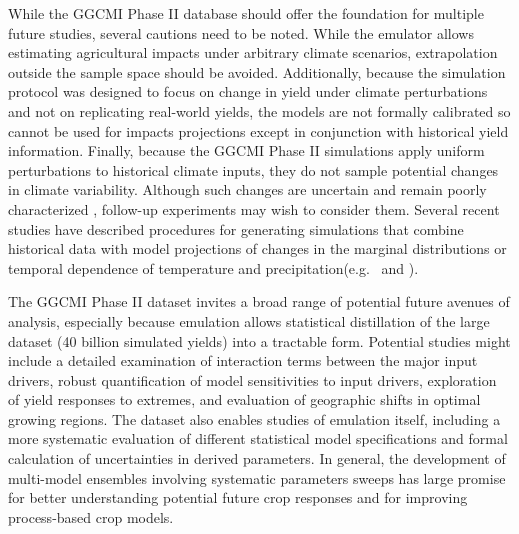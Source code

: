 \documentclass[gmd, manuscript]{copernicus} %
\begin{document}
While the GGCMI Phase II database should offer the foundation for multiple future studies, several cautions need to be noted. While the emulator allows estimating agricultural impacts under arbitrary climate scenarios, extrapolation outside the sample space should be avoided. Additionally, because the simulation protocol was designed to focus on change in yield under climate perturbations and not on replicating real-world yields, the models are not formally calibrated so cannot be used for impacts projections except in conjunction with historical yield information. Finally, because the GGCMI Phase II simulations apply uniform perturbations to historical climate inputs, they do not sample potential changes in climate variability. Although such changes are uncertain and remain poorly characterized \citep[e.g.][]{Alexande2006, Kodra2014}, follow-up experiments may wish to consider them. Several recent studies have described procedures for generating simulations that combine historical data with model projections of changes in the marginal distributions or temporal dependence of temperature and precipitation(e.g.\ \citet{Leeds2015, poppick2016, Won16} and \citet{Haugen2018}).

The GGCMI Phase II dataset invites a broad range of potential future avenues of analysis, especially because emulation allows statistical distillation of the large dataset (40 billion simulated yields) into a tractable form. Potential studies might include a detailed examination of interaction terms between the major input drivers, robust quantification of model sensitivities to input drivers, exploration of yield responses to extremes, and evaluation of geographic shifts in optimal growing regions. The dataset also enables studies of emulation itself, including a more systematic evaluation of different statistical model specifications and formal calculation of uncertainties in derived parameters. In general, the development of multi-model ensembles involving systematic parameters sweeps has large promise for better understanding potential future crop responses and for improving process-based crop models.


\appendix
\section{}
\end{document}

